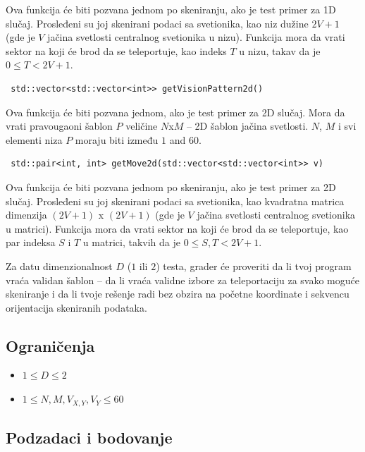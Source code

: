 \documentclass[12pt]{article}
\begin{document}
Ova funkcija će biti pozvana jednom po skeniranju, ako je test primer za 1D slučaj. Prosleđeni su joj skenirani podaci sa svetionika, kao niz dužine $2V + 1$ (gde je $V$ jačina svetlosti centralnog svetionika u nizu). Funkcija mora da vrati sektor na koji će brod da se teleportuje, kao indeks $T$ u nizu, takav da je $0 \leq T < 2V + 1$.

\begin{lstlisting}
 std::vector<std::vector<int>> getVisionPattern2d()
\end{lstlisting}

Ova funkcija će biti pozvana jednom, ako je test primer za 2D slučaj. Mora da vrati pravougaoni šablon $P$ veličine $N$x$M$ -- 2D šablon jačina svetlosti. $N$, $M$ i svi elementi niza $P$ moraju biti između $1$ and $60$.

\begin{lstlisting}
 std::pair<int, int> getMove2d(std::vector<std::vector<int>> v)
\end{lstlisting}

Ova funkcija će biti pozvana jednom po skeniranju, ako je test primer za 2D slučaj. Prosleđeni su joj skenirani podaci sa svetionika, kao kvadratna matrica dimenzija $(2V + 1)$ x $(2V + 1)$ (gde je $V$ jačina svetlosti centralnog svetionika u matrici). Funkcija mora da vrati sektor na koji će brod da se teleportuje, kao par indeksa $S$ i $T$ u matrici, takvih da je $0 \leq S, T < 2V + 1$.

Za datu dimenzionalnost $D$ ($1$ ili $2$) testa, grader će proveriti da li tvoj program vraća validan šablon -- da li vraća validne izbore za teleportaciju za svako moguće skeniranje i da li tvoje rešenje radi bez obzira na početne koordinate i sekvencu orijentacija skeniranih podataka.

\subsection{Ograničenja}

\vspace{0.1em}

\begin{itemize}
\item $1 \leq D \leq 2$
\item $1 \leq N, M, V_{X, Y}, V_Y \leq 60$
\end{itemize}

\newpage

\subsection{Podzadaci i bodovanje}
\end{document}

